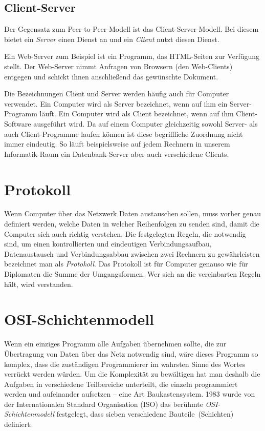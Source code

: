 \subsection{Client-Server}

Der Gegensatz zum Peer-to-Peer-Modell ist das Client-Server-Modell. Bei diesem
bietet ein \emph{Server} einen Dienst an und ein \emph{Client} nutzt diesen
Dienst.

Ein Web-Server zum Beispiel ist ein Programm, das HTML-Seiten zur Verfügung
stellt. Der Web-Server nimmt Anfragen von Browsern (den Web-Clients) entgegen
und schickt ihnen anschließend das gewünschte Dokument.

Die Bezeichnungen Client und Server werden häufig auch für Computer verwendet.
Ein Computer wird als Server bezeichnet, wenn auf ihm ein Server-Programm
läuft. Ein Computer wird als Client bezeichnet, wenn auf ihm Client-Software
ausgeführt wird. Da auf einem Computer gleichzeitig sowohl Server- als auch
Client-Programme laufen können ist diese begriffliche Zuordnung nicht immer
eindeutig. So läuft beispielsweise auf jedem Rechnern in unserem Informatik-Raum
ein Datenbank-Server aber auch verschiedene Clients.


\section{Protokoll}

Wenn Computer über das Netzwerk Daten austauschen sollen, muss vorher genau
definiert werden, welche Daten in welcher Reihenfolgen zu senden sind, damit
die Computer sich auch richtig verstehen. Die festgelegten Regeln, die
notwendig sind, um einen kontrollierten und eindeutigen Verbindungsaufbau,
Datenaustausch und Verbindungsabbau zwischen zwei Rechnern zu gewährleisten
bezeichnet man als \emph{Protokoll}. Das Protokoll ist für Computer genauso wie
für Diplomaten die Summe der Umgangsformen. Wer sich an die vereinbarten Regeln
hält, wird verstanden.


\section{OSI-Schichtenmodell}

Wenn ein einziges Programm alle Aufgaben übernehmen sollte, die zur Übertragung
von Daten über das Netz notwendig sind, wäre dieses Programm so komplex, dass
die zuständigen Programmierer im wahrsten Sinne des Wortes verrückt werden
würden. Um die Komplexität zu bewältigen hat man deshalb die Aufgaben in
verschiedene Teilbereiche unterteilt, die einzeln programmiert werden und
aufeinander aufsetzen -- eine Art \glqq Baukastensystem\grqq . 1983 wurde von
der Internationalen Standard Organisation (ISO) das berühmte
\emph{OSI-Schichtenmodell} festgelegt, dass sieben verschiedene \glqq
Bauteile\grqq\ (Schichten) definiert:


